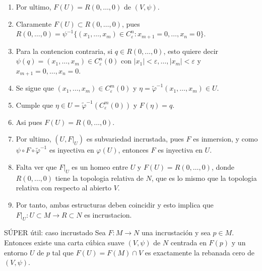\begin{bookproof}{}
\begin{enumerate}[start=3]
\item Por ultimo, $F(U)=R(0,\ldots,0)$ de $(V,\psi)$.
\item Claramente $F(U)\subset R(0,\ldots,0)$, pues $R(0,\ldots,0)=\psi^{-1}\{(x_1,\ldots,x_m)\in C_\varepsilon^n:x_{m+1}=0,\ldots,x_n=0\}$.
\item Para la contencion contraria, si $q\in R(0,\ldots,0)$, esto quiere decir $\psi(q)=(x_1,\ldots,x_m)\in C_\varepsilon^n(0)$ con $|x_1|<\varepsilon,\ldots,|x_m|<\varepsilon$ y $x_{m+1}=0,\ldots,x_n=0$.
\item Se sigue que $(x_1,\ldots,x_m)\in C_\varepsilon^m(0)$ y $\eta=\widetilde\varphi^{-1}(x_1,\ldots,x_m)\in U$.
\item Cumple que $\eta\in U=\widetilde\varphi^{-1}(C_\varepsilon^m(0))$ y $F(\eta)=q$.
\item Asi pues $F(U)=R(0,\ldots,0)$.
\item Por ultimo, $(U,F|_U)$ es subvariedad incrustada, pues $F$ es inmersion, y como $\psi\circ F\circ\widetilde\varphi^{-1}$ es inyectiva en $\varphi(U)$, entonces $F$ es inyectiva en $U$.
\item Falta ver que $F|_U$ es un homeo entre $U$ y $F(U)=R(0,\ldots,0)$, donde $R(0,\ldots,0)$ tiene la topologia relativa de $N$, que es lo mismo que la topologia relativa con respecto al abierto $V$.
\item Por tanto, ambas estructuras deben coincidir y esto implica que $F|_U:U\subset M\to R\subset N$ es incrustacion.
\end{enumerate}
\bookqed
\end{bookproof}
\label{blk:d6bd60}
\begin{bookcorollary}{SÚPER útil: caso incrustado}
Sea $F:M\to N$ una incrustación y sea $p\in M$. Entonces existe una carta cúbica suave $(V,\psi)$ de $N$ centrada en $F(p)$ y un entorno $U$ de $p$ tal que $F(U)=F(M)\cap V$ es exactamente la rebanada cero de $(V,\psi)$. 


\end{bookcorollary}
